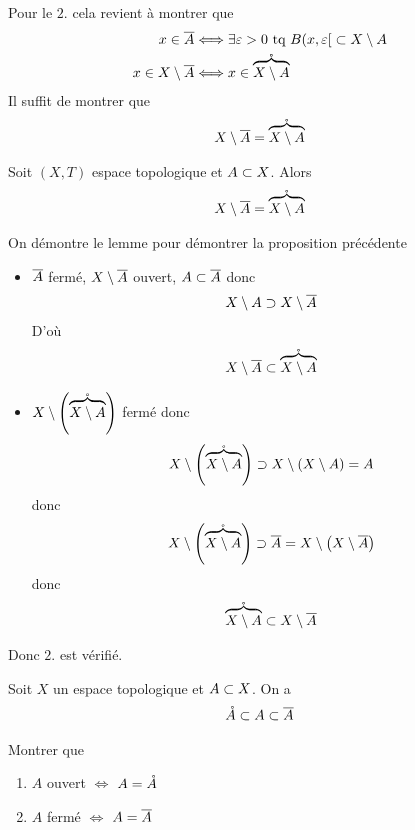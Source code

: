 \documentclass[french,a4paper,10pt]{article}
\begin{document}
\begin{myproof}
		Pour le $2.$ cela revient à montrer que 
		\[\begin{aligned}
			x\in\overline{A} &\Longleftrightarrow \exists\varepsilon>0\text{ tq }B({x, \varepsilon}\mathopen{}[\mathclose{}\subset X\setminus A\\
			x\in X\setminus\overline{A}&\Longleftrightarrow x\in \mathring{\overbrace{X\setminus A}}
		\end{aligned}\]
		Il suffit de montrer que 
		\[\begin{aligned}
			X\setminus \overline{A} = \mathring{\overbrace{X\setminus A}}
		\end{aligned}\]
		\begin{lemme}
			Soit $(X, T)$ espace topologique et $A\subset X$. Alors
			\[\begin{aligned}
				X\setminus \overline{A} = \mathring{\overbrace{X\setminus A}}
			\end{aligned}\]
		\end{lemme}
		\begin{myproof}
			On démontre le lemme pour démontrer la proposition précédente
			\begin{itemize}[$\subset$]
				\item $\overline{A}$ fermé, $X\setminus\overline{A}$ ouvert, $A\subset \overline{A}$ donc 
				\[\begin{aligned}
					X\setminus A \supset X\setminus \overline{A}
				\end{aligned}\]
				D'où
				\[\begin{aligned}
					X\setminus \overline{A} \subset \mathring{\overbrace{X\setminus A}}
				\end{aligned}\]
			\end{itemize}
			\begin{itemize}[$\supset$]
				\item $X\setminus \left(\mathring{\overbrace{X\setminus A}}\right)$ fermé donc 
				\[\begin{aligned}
					X\setminus \left(\mathring{\overbrace{X\setminus A}}\right) \supset X\setminus \left(X\setminus A\right) = A
				\end{aligned}\]
				donc 
				\[\begin{aligned}
					X\setminus \left(\mathring{\overbrace{X\setminus A}}\right) \supset \overline{A} = X\setminus\left(X\setminus\overline{A}\right)
				\end{aligned}\]
				donc 
				\[\begin{aligned}
					\mathring{\overbrace{X\setminus A}} \subset X\setminus \overline{A}
				\end{aligned}\]
			\end{itemize}
		\end{myproof}
		Donc $2.$ est vérifié.
	\end{myproof}
	\begin{remark}
		Soit $X$ un espace topologique et $A\subset X$. On a 
			\[\begin{aligned}
				\mathring{A}\subset A\subset \overline{A}
			\end{aligned}\]
		\begin{exercise}
			Montrer que 
			\begin{enumerate}
				\item $A$ ouvert $\Longleftrightarrow$ $A=\mathring{A}$
				\item $A$ fermé $\Longleftrightarrow$ $A=\overline{A}$
			\end{enumerate}
		\end{exercise}
	\end{remark}
\end{document}
